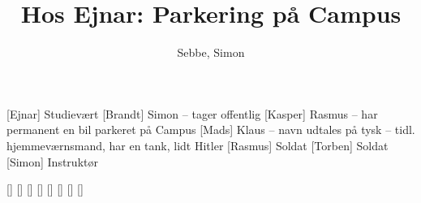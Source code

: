 \documentclass[a4paper,11pt]{article}
\title{Hos Ejnar: Parkering på Campus}
\author{Sebbe, Simon}
\begin{document}
\maketitle

\begin{roles}
[Ejnar] Studievært
[Brandt] Simon -- tager offentlig
[Kasper] Rasmus -- har permanent en bil parkeret på Campus
[Mads] Klaus -- navn udtales på tysk -- tidl. hjemmeværnsmand, har en tank, lidt Hitler
[Rasmus] Soldat
[Torben] Soldat
[Simon] Instruktør
\end{roles}

\begin{props}
[]
[]
[]
[]
[]
[]
[]
[]
\end{props}
\end{document}
